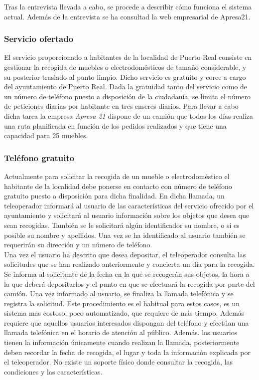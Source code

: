 Tras la entrevista llevada a cabo, se procede a describir cómo funciona el sistema actual. Además de la entrevista se ha consultad la web empresarial de Apresa21\cite{apresa21:web}.

\subsubsection*{Servicio ofertado}
El servicio proporcionado a habitantes de la localidad de Puerto Real consiste en gestionar la recogida de muebles o electrodomésticos de tamaño considerable, y su posterior traslado al punto limpio. Dicho servicio es gratuito y coree a cargo del ayuntamiento de Puerto Real. Dada la gratuidad tanto del servicio como de un número de teléfono puesto a disposición de la ciudadanía, se limita el número de peticiones diarias por habitante en tres enseres diarios. Para llevar a cabo dicha tarea la empresa \textit{Apresa 21} dispone de un camión que todos los días realiza una ruta planificada en función de los pedidos realizados y que tiene una capacidad para 25 muebles. \\

\subsubsection*{Teléfono gratuito}
Actualmente para solicitar la recogida de un mueble o electrodoméstico el habitante de la localidad debe ponerse en contacto con número de teléfono gratuito puesto a disposición para dicha finalidad. En dicha llamada, un teleoperador informará al usuario de las características del servicio ofrecido por el ayuntamiento y solicitará al usuario información sobre los objetos que desea que sean recogidas. También se le solicitará algún identificador su nombre, o si es posible su nombre y apellidos. Una vez se ha identificado al usuario también se requerirán su dirección y un número de teléfono. \\

Una vez el usuario ha descrito que desea depositar, el teleoperador consulta las solicitudes que se han realizado anteriormente y concierta un día para la recogida. Se informa al solicitante de la fecha en la que se recogerán sus objetos, la hora a la que deberá depositarlos y el punto en que se efectuará la recogida por parte del camión. Una vez informado al usuario, se finaliza la llamada telefónica y se registra la solicitud. Este procedimiento es el habitual para estos casos, es un sistema mas costoso, poco automatizado, que requiere de más tiempo. Además requiere que aquellos usuarios interesados dispongan del teléfono y efectúan una llamada telefónica en el horario de atención al público. Además. los usuarios tienen la información únicamente cuando realizan la llamada, posteriormente deben recordar la fecha de recogida, el lugar y toda la información explicada por el teleoperador. No existe un soporte físico donde consultar la recogida, las condiciones y las características. \\

